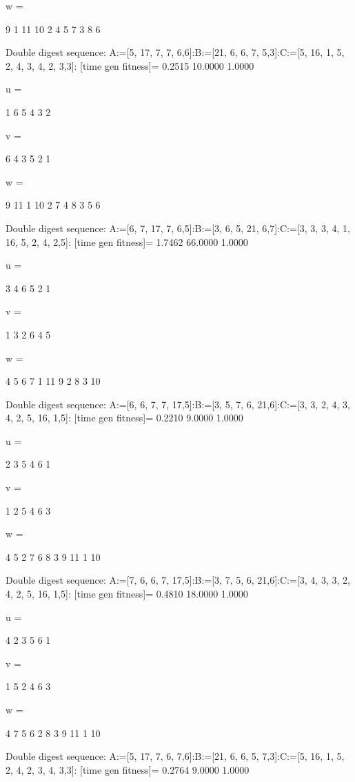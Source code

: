 w =

     9     1    11    10     2     4     5     7     3     8     6

Double digest sequence:
A:=[5, 17, 7, 7, 6,6]:B:=[21, 6, 6, 7, 5,3]:C:=[5, 16, 1, 5, 2, 4, 3, 4, 2, 3,3]:
[time gen fitness]=
    0.2515   10.0000    1.0000


u =

     1     6     5     4     3     2


v =

     6     4     3     5     2     1


w =

     9    11     1    10     2     7     4     8     3     5     6

Double digest sequence:
A:=[6, 7, 17, 7, 6,5]:B:=[3, 6, 5, 21, 6,7]:C:=[3, 3, 3, 4, 1, 16, 5, 2, 4, 2,5]:
[time gen fitness]=
    1.7462   66.0000    1.0000


u =

     3     4     6     5     2     1


v =

     1     3     2     6     4     5


w =

     4     5     6     7     1    11     9     2     8     3    10

Double digest sequence:
A:=[6, 6, 7, 7, 17,5]:B:=[3, 5, 7, 6, 21,6]:C:=[3, 3, 2, 4, 3, 4, 2, 5, 16, 1,5]:
[time gen fitness]=
    0.2210    9.0000    1.0000


u =

     2     3     5     4     6     1


v =

     1     2     5     4     6     3


w =

     4     5     2     7     6     8     3     9    11     1    10

Double digest sequence:
A:=[7, 6, 6, 7, 17,5]:B:=[3, 7, 5, 6, 21,6]:C:=[3, 4, 3, 3, 2, 4, 2, 5, 16, 1,5]:
[time gen fitness]=
    0.4810   18.0000    1.0000


u =

     4     2     3     5     6     1


v =

     1     5     2     4     6     3


w =

     4     7     5     6     2     8     3     9    11     1    10

Double digest sequence:
A:=[5, 17, 7, 6, 7,6]:B:=[21, 6, 6, 5, 7,3]:C:=[5, 16, 1, 5, 2, 4, 2, 3, 4, 3,3]:
[time gen fitness]=
    0.2764    9.0000    1.0000


